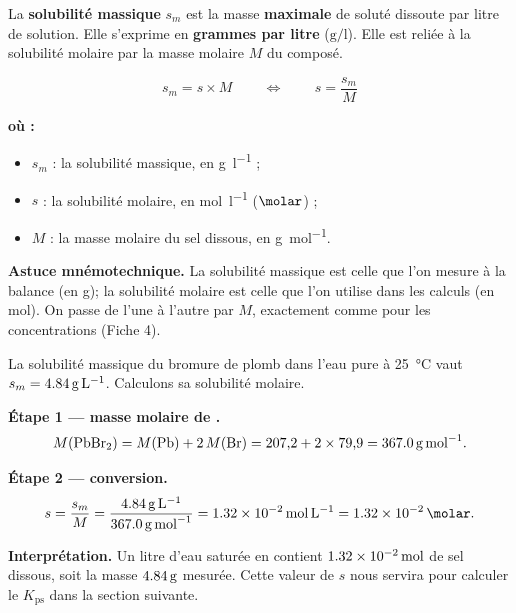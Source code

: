 \documentclass[11pt,a4paper]{article}
\newenvironment{ou}{%
  \par\smallskip\noindent\textbf{où :}\nopagebreak
  \begin{itemize}[leftmargin=1.8em,topsep=2pt,itemsep=1.5pt,parsep=0pt]}%
  {\end{itemize}}
\newcommand{\Kps}{K_{\mathrm{ps}}}
\begin{document}
\begin{definition}
La \textbf{solubilité massique} $s_m$ est la masse \textbf{maximale} de soluté dissoute par litre de
solution. Elle s'exprime en \textbf{grammes par litre} ($\si{\gram\per\litre}$). Elle est reliée à la
solubilité molaire par la masse molaire $M$ du composé.
\end{definition}

\begin{formule}
\[ \boxed{\,s_m = s \times M\,} \qquad\Longleftrightarrow\qquad
   \boxed{\,s = \dfrac{s_m}{M}\,} \]
\end{formule}

\begin{ou}
  \item $s_m$ : la solubilité massique, en \si{\gram\per\litre} ;
  \item $s$ : la solubilité molaire, en \si{\mole\per\litre} ($\si{\molar}$) ;
  \item $M$ : la masse molaire du sel dissous, en \si{\gram\per\mole}.
\end{ou}

\noindent\textbf{Astuce mnémotechnique.} La solubilité massique est celle que l'on mesure à la balance
(en \si{\gram}); la solubilité molaire est celle que l'on utilise dans les calculs (en \si{\mole}).
On passe de l'une à l'autre par $M$, exactement comme pour les concentrations (Fiche 4).

\begin{exemple}
La solubilité massique du bromure de plomb  dans l'eau pure à \qty{25}{\degreeCelsius} vaut
$s_m=\qty{4{,}84}{\gram\per\litre}$. Calculons sa solubilité molaire.

\smallskip
\textbf{Étape 1 — masse molaire de .}
\[ M(\ce{PbBr2}) = M(\ce{Pb}) + 2\,M(\ce{Br}) = 207{,}2 + 2\times 79{,}9
   = \qty{367{,}0}{\gram\per\mole}. \]

\textbf{Étape 2 — conversion.}
\[ s = \dfrac{s_m}{M} = \dfrac{\qty{4{,}84}{\gram\per\litre}}{\qty{367{,}0}{\gram\per\mole}}
     = \qty{1{,}32e-2}{\mole\per\litre} = \qty{1{,}32e-2}{\molar}. \]

\textbf{Interprétation.} Un litre d'eau saturée en  contient
$\qty{1{,}32e-2}{\mole}$ de sel dissous, soit la masse $\qty{4{,}84}{\gram}$ mesurée. Cette valeur de
$s$ nous servira pour calculer le $\Kps$ dans la section suivante.
\end{exemple}
\end{document}
